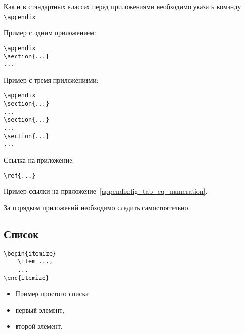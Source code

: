 \documentclass[14pt, a4paper, titlepage]{extarticle}
\renewcommand{\thesection}{\Asbuk{section}}
\let\oldsec\section
\renewcommand{\section}{
        \clearpage
        \phantomsection
        \refstepcounter{section}
        \setcounter{figure}{0} %
        \setcounter{table}{0} %
        \setcounter{equation}{0} %
        \addcontentsline{toc}{section}{\appendixname~\thesection}
        \oldsec*} %
\begin{document}
Как и в стандартных классах перед приложениями необходимо указать команду \verb"\appendix".

Пример с одним приложением:
\begin{verbatim}
\appendix
\section{...}
...
\end{verbatim}

Пример с тремя приложениями:
\begin{verbatim}
\appendix
\section{...}
...
\section{...}
...
\section{...}
...
\end{verbatim}

Ссылка на приложение:
\begin{verbatim}
\ref{...}
\end{verbatim}

Пример ссылки на приложение~\ref{appendix:fig_tab_eq_numeration}.

За порядком приложений необходимо следить самостоятельно.

\subsection{Список}

\begin{verbatim}
\begin{itemize}
    \item ...,
    ...
\end{itemize}
\end{verbatim}

\begin{itemize}
    \item[] Пример простого списка:
    \item первый элемент,
    \item второй элемент.
\end{itemize}
\end{document}
